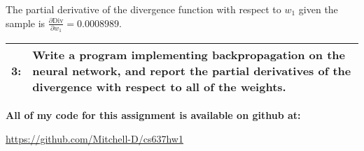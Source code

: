 \documentclass[12pt]{article}
\newcommand*{\problem}[2]{
    \begin{table}[ht]
    \centering
        \begin{tabular}{ | p{.1\linewidth} p{.9\linewidth} | }
            \hline
            \vspace{.3em}\textbf{\large#1:} & \vspace{.3em}\small{#2}\hspace{.2em}\vspace{.5em} \\ \hline
        \end{tabular}
    \end{table}
}
\begin{document}
The partial derivative of the divergence function with respect to $w_1$ given the sample is $\frac{\partial \text{Div}}{\partial w_1} = 0.0008989$.


\problem{3}{Write a program implementing backpropagation on the neural network, and report the partial derivatives of the divergence with respect to all of the weights.}


\vspace{1em}
\centering\large
\textbf{All of my code for this assignment is available on github at:}

\centering\large
\url{https://github.com/Mitchell-D/cs637hw1}
\end{document}
